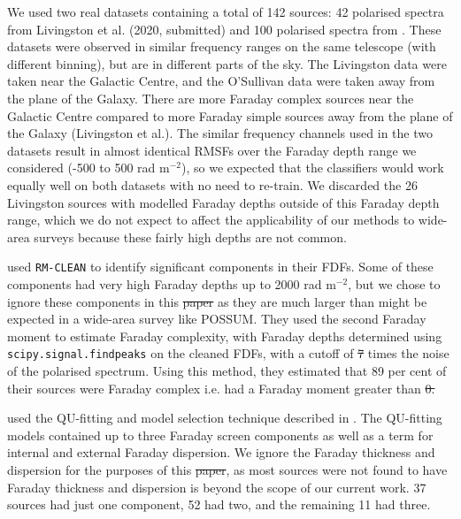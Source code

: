 \documentclass[11pt, a4paper]{book}
\providecommand{\DIFaddtex}[1]{{\protect\color{blue}\uwave{#1}}} %
\providecommand{\DIFdeltex}[1]{{\protect\color{red}\sout{#1}}}                      %
\providecommand{\DIFaddbegin}{} %
\providecommand{\DIFaddend}{} %
\providecommand{\DIFdelbegin}{} %
\providecommand{\DIFdelend}{} %
\providecommand{\DIFadd}[1]{\texorpdfstring{\DIFaddtex{#1}}{#1}} %
\providecommand{\DIFdel}[1]{\texorpdfstring{\DIFdeltex{#1}}{}} %
\newcommand{\DIFscaledelfig}{0.5}
\newlength{\DIFdelgraphicswidth} %
\newlength{\DIFdelgraphicsheight} %
\newcommand{\DIFaddincludegraphics}[2][]{{\color{blue}\fbox{\DIFOincludegraphics[#1]{#2}}}} %
\newcommand{\DIFdelincludegraphics}[2][]{%
\sbox{\DIFdelgraphicsbox}{\DIFOincludegraphics[#1]{#2}}%
\settoboxwidth{\DIFdelgraphicswidth}{\DIFdelgraphicsbox} %
\settoboxtotalheight{\DIFdelgraphicsheight}{\DIFdelgraphicsbox} %
\scalebox{\DIFscaledelfig}{%
\parbox[b]{\DIFdelgraphicswidth}{\usebox{\DIFdelgraphicsbox}\\[-\baselineskip] \rule{\DIFdelgraphicswidth}{0em}}\llap{\resizebox{\DIFdelgraphicswidth}{\DIFdelgraphicsheight}{%
\setlength{\unitlength}{\DIFdelgraphicswidth}%
\begin{picture}(1,1)%
\thicklines\linethickness{2pt} %
{\color[rgb]{1,0,0}\put(0,0){\framebox(1,1){}}}%
{\color[rgb]{1,0,0}\put(0,0){\line( 1,1){1}}}%
{\color[rgb]{1,0,0}\put(0,1){\line(1,-1){1}}}%
\end{picture}%
}\hspace*{3pt}}} %
} %
\DeclareRobustCommand{\DIFaddbegin}{\DIFOaddbegin \let\includegraphics\DIFaddincludegraphics} %
\DeclareRobustCommand{\DIFaddend}{\DIFOaddend \let\includegraphics\DIFOincludegraphics} %
\DeclareRobustCommand{\DIFdelbegin}{\DIFOdelbegin \let\includegraphics\DIFdelincludegraphics} %
\DeclareRobustCommand{\DIFdelend}{\DIFOaddend \let\includegraphics\DIFOincludegraphics} %
\begin{document}
    We used two real datasets containing a total of 142 sources: 42 polarised spectra from Livingston et al. (2020, submitted) and 100 polarised spectra from \citet{osullivan_broad-band_2017}. These datasets were observed in similar frequency ranges on the same telescope (with different binning), but are in different parts of the sky. The Livingston data were taken near the Galactic Centre, and the O'Sullivan data were taken away from the plane of the Galaxy. There are more Faraday complex sources near the Galactic Centre compared to more Faraday simple sources away from the plane of the Galaxy (Livingston et al.). The similar frequency channels used in the two datasets result in almost identical RMSFs over the Faraday depth range we considered (-500 to 500 rad m$^{-2}$), so we expected that the classifiers would work equally well on both datasets with no need to re-train. We discarded the 26 Livingston sources with modelled Faraday depths outside of this Faraday depth range, which we do not expect to affect the applicability of our methods to wide-area surveys because these fairly high depths are not common.

    \citet{livingston21faraday} used \texttt{RM-CLEAN} \citep{heald09faraday} to identify significant components in their FDFs. Some of these components had very high Faraday depths up to 2000 rad m$^{-2}$, but we chose to ignore these components in this \DIFdelbegin \DIFdel{paper }\DIFdelend \DIFaddbegin \DIFadd{chapter }\DIFaddend as they are much larger than might be expected in a wide-area survey like POSSUM. They used the second Faraday moment \citep{brown11report} to estimate Faraday complexity, with Faraday depths determined using \texttt{scipy.signal.find\textunderscore{}peaks} on the cleaned FDFs, with a cutoff of \DIFdelbegin \DIFdel{7 }\DIFdelend \DIFaddbegin \DIFadd{seven }\DIFaddend times the noise of the polarised spectrum. Using this method, they estimated that 89 per cent of their sources were Faraday complex i.e. had a Faraday moment greater than \DIFdelbegin \DIFdel{0.
}\DIFdelend \DIFaddbegin \DIFadd{zero.
}\DIFaddend 

    \citet{osullivan_broad-band_2017} used the QU-fitting and model selection technique described in \citet{osullivan12agn}. The QU-fitting models contained up to three Faraday screen components as well as a term for internal and external Faraday dispersion. We ignore the Faraday thickness and dispersion for the purposes of this \DIFdelbegin \DIFdel{paper}\DIFdelend \DIFaddbegin \DIFadd{chapter}\DIFaddend , as most sources were not found to have Faraday thickness and dispersion is beyond the scope of our current work. 37 sources had just one component, 52 had two, and the remaining 11 had three.
\end{document}
